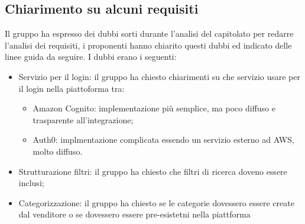\documentclass[a4paper]{article}
\begin{document}
        \subsection{Chiarimento su alcuni requisiti}
        Il gruppo ha espresso dei dubbi sorti durante l'analisi del capitolato per redarre l'analisi dei requisiti, i proponenti hanno chiarito questi dubbi ed indicato delle linee guida da seguire.
        I dubbi erano i seguenti:
        \begin{itemize}
            \item Servizio per il login: il gruppo ha chiesto chiarimenti su che servizio usare per il login nella piattoforma tra:
            \begin{itemize}
                \item Amazon Cognito: implementazione più semplice, ma poco diffuso e trasparente all'integrazione;
                \item Auth0: implmentazione complicata essendo un servizio esterno ad AWS, molto diffuso.
            \end{itemize}
            \item Strutturazione filtri: il gruppo ha chiesto che filtri di ricerca doveno essere inclusi;
            \item Categorizzazione: il gruppo ha chiesto se le categorie dovessero essere create dal venditore o se dovessero essere pre-esistetni nella piattforma
        \end{itemize}
\end{document}
